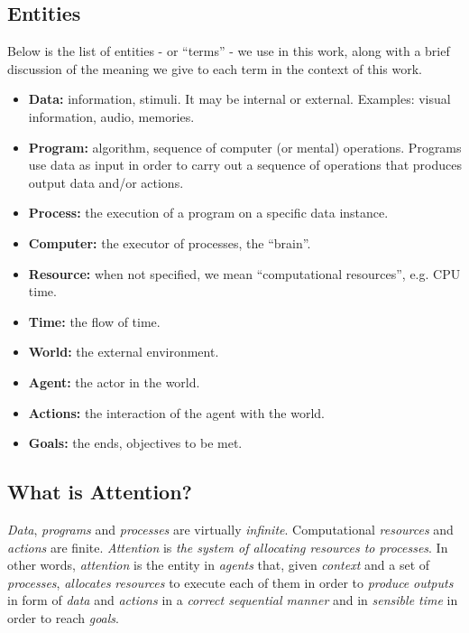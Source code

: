 \documentclass[7pt]{article}
\begin{document}
\subsection{Entities}
Below is the list of entities - or ``terms'' - we use in this work, along with a brief discussion of the meaning
we give to each term in the context of this work.

\begin{itemize}
    \item\textbf{Data:} information, stimuli. It may be internal or external. Examples: visual information, audio, memories.
    \item\textbf{Program:} algorithm, sequence of computer (or mental) operations. Programs use data as input in order to carry out a sequence of operations that produces output data and/or actions.
    \item\textbf{Process:} the execution of a program on a specific data instance.
    \item\textbf{Computer:} the executor of processes, the “brain”.
    \item\textbf{Resource:} when not specified, we mean “computational resources”, e.g. CPU time.
    \item\textbf{Time:} the flow of time.
    \item\textbf{World:} the external environment.
    \item\textbf{Agent:} the actor in the world.
    \item\textbf{Actions:} the interaction of the agent with the world.
    \item\textbf{Goals:} the ends, objectives to be met.
\end{itemize}

\subsection{What is Attention?}
\emph{Data}, \emph{programs} and \emph{processes} are virtually \emph{infinite}.
Computational \emph{resources} and \emph{actions} are finite.
\emph{Attention} is \emph{the system of allocating resources to processes}.
In other words, \emph{attention} is the entity in \emph{agents} that, given \emph{context} and a set of \emph{processes},
\emph{allocates} \emph{resources} to execute each of them in order to \emph{produce} \emph{outputs} in form of \emph{data} and \emph{actions} in a \emph{correct sequential manner} and in \emph{sensible time} in order to reach \emph{goals}.
\end{document}
